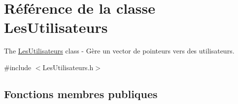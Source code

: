 \hypertarget{class_les_utilisateurs}{\section{Référence de la classe Les\-Utilisateurs}
\label{class_les_utilisateurs}
}


The \hyperlink{class_les_utilisateurs}{Les\-Utilisateurs} class -\/ Gère un vector de pointeurs vers des utilisateurs.  




{\ttfamily \#include $<$Les\-Utilisateurs.\-h$>$}

\subsection*{Fonctions membres publiques}
